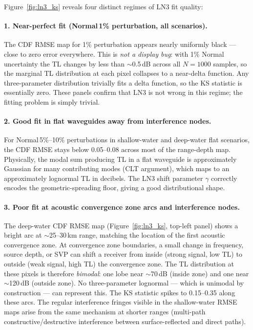 \documentclass[11pt,a4paper]{article}
\begin{document}
Figure~\ref{fig:ln3_ks} reveals four
distinct regimes of LN3 fit quality:

\paragraph{1. Near-perfect fit (Normal\,1\% perturbation, all scenarios).}
The CDF RMSE map for 1\% perturbation appears nearly uniformly black --- close to zero
error everywhere.
This is \emph{not a display bug}: with 1\% Normal uncertainty the TL changes by less than
$\sim$0.5\,dB across all $N=1000$ samples, so the marginal TL distribution at each pixel
collapses to a near-delta function.
Any three-parameter distribution trivially fits a delta function, so the KS statistic is
essentially zero.
These panels confirm that LN3 is not wrong in this regime; the fitting problem is simply
trivial.

\paragraph{2. Good fit in flat waveguides away from interference nodes.}
For Normal\,5\%--10\% perturbations in shallow-water and deep-water flat scenarios, the
CDF RMSE stays below 0.05--0.08 across most of the range-depth map.
Physically, the modal sum producing TL in a flat waveguide is approximately Gaussian for
many contributing modes (CLT argument), which maps to an approximately lognormal TL in
decibels.
The LN3 shift parameter $\gamma$ correctly encodes the geometric-spreading floor, giving
a good distributional shape.

\paragraph{3. Poor fit at acoustic convergence zone arcs and interference nodes.}
The deep-water CDF RMSE map (Figure~\ref{fig:ln3_ks}, top-left panel) shows a
bright arc at $\sim$25--30\,km range, matching the location of the first acoustic
convergence zone.
At convergence zone boundaries, a small change in frequency, source depth, or SVP can
shift a receiver from inside (strong signal, low TL) to outside (weak signal, high TL)
the convergence zone.
The TL distribution at these pixels is therefore \emph{bimodal}: one lobe near
$\sim$70\,dB (inside zone) and one near $\sim$120\,dB (outside zone).
No three-parameter lognormal --- which is unimodal by construction --- can represent this.
The KS statistic spikes to 0.15--0.35 along these arcs.
The regular interference fringes visible in the shallow-water RMSE maps arise from the
same mechanism at shorter ranges (multi-path constructive/destructive interference between
surface-reflected and direct paths).
\end{document}
